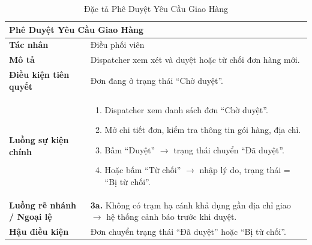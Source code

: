 \begin{table}[H]
  \centering
  \begin{tabularx}{\textwidth}{|l|X|}
    \hline
    \multicolumn{2}{|l|}{\textbf{Phê Duyệt Yêu Cầu Giao Hàng}} \\
    \hline
    \textbf{Tác nhân}           & Điều phối viên \\ \hline
    \textbf{Mô tả}              & Dispatcher xem xét và duyệt hoặc từ chối đơn hàng mới. \\ \hline
    \textbf{Điều kiện tiên quyết} & Đơn đang ở trạng thái ``Chờ duyệt''. \\ \hline
    \textbf{Luồng sự kiện chính} &
      \begin{enumerate}[leftmargin=*, nosep, topsep=0pt]
        \item Dispatcher xem danh sách đơn ``Chờ duyệt''.
        \item Mở chi tiết đơn, kiểm tra thông tin gói hàng, địa chỉ.
        \item Bấm ``Duyệt'' $\rightarrow$ trạng thái chuyển ``Đã duyệt''.
        \item Hoặc bấm ``Từ chối'' $\rightarrow$ nhập lý do, trạng thái = ``Bị từ chối''.
      \end{enumerate} \\ \hline
    \textbf{Luồng rẽ nhánh / Ngoại lệ} &
      \textbf{3a.} Không có trạm hạ cánh khả dụng gần địa chỉ giao $\rightarrow$ hệ thống cảnh báo trước khi duyệt. \\ \hline
    \textbf{Hậu điều kiện}      & Đơn chuyển trạng thái ``Đã duyệt'' hoặc ``Bị từ chối''. \\
    \hline
  \end{tabularx}
  \caption{Đặc tả Phê Duyệt Yêu Cầu Giao Hàng}
  \label{tab:uc04}
\end{table}


